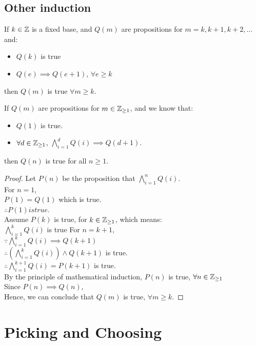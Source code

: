 \documentclass[a4paper]{article}
\begin{document}
\subsection{Other induction}
\begin{thm}
If $k \in \mathbb{Z}$ is a fixed base, and $Q(m)$ are propositions for $m = k, k+1, k+2,...$ and:
\begin{itemize}
	\item $Q(k)$ is true
	\item $Q(e) \implies Q(e+1)$, $\forall e \geq k$
\end{itemize}
then $Q(m)$ is true $\forall m \geq k$.
\end{thm}

\begin{thm}
If $Q(m)$ are propositions for $m \in \mathbb{Z}_{\geq 1}$, and we know that:
\begin{itemize}
	\item $Q(1)$ is true.
	\item $\forall d \in \mathbb{Z}_{\geq 1}$, $\bigwedge^{d}_{i = 1}Q(i) \implies Q(d+1)$.
\end{itemize}
then $Q(n)$ is true for all $n \geq 1$.
\end{thm}
\begin{proof}
Let $P(n)$ be the proposition that $\bigwedge^{n}_{i = 1}Q(i)$.\\
For $n=1$,\\
$P(1) = Q(1)$ which is true.\\
$\therefore P(1) is true$.\\
Assume $P(k)$ is true, for $k \in \mathbb{Z}_{\geq 1}$, which means:\\
$\bigwedge^{k}_{i = 1}Q(i)$ is true
For $n = k+1$,\\
$\because \bigwedge^{k}_{i = 1}Q(i) \implies Q(k+1)$\\
$\therefore (\bigwedge^{k}_{i = 1}Q(i)) \land Q(k+1)$ is true.\\
$\therefore \bigwedge^{k+1}_{i = 1}Q(i) = P(k+1)$ is true.\\
By the principle of mathematical induction, $P(n)$ is true, $\forall n \in \mathbb{Z}_{\geq 1}$\\
Since $P(n) \implies Q(n)$,\\
Hence, we can conclude that $Q(m)$ is true, $\forall m \geq k$.
\end{proof}

\section{Picking and Choosing}
\end{document}
